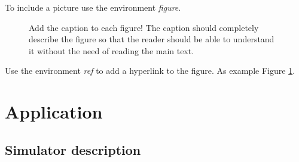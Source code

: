 \documentclass[]{report}
\begin{document}
To include a picture use the environment \textit{figure}. 
\begin{figure}[h!]
	\centering
	\caption{Add the caption to each figure! The caption should completely describe the figure so that the reader should be able to understand it without the need of reading the main text.}
	\label{fig:FigureA}
\end{figure}
Use the environment \textit{ref} to add a hyperlink to the figure. As example Figure \ref{fig:FigureA}.

\chapter{Application}

\section{Simulator description}
\end{document}
